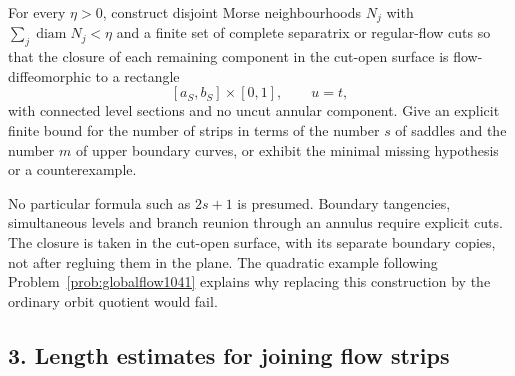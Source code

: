 \begin{problem}\label{prob:reeb1041}
For every $\eta>0$, construct disjoint Morse neighbourhoods $N_j$ with
$\sum_j\operatorname{diam}N_j<\eta$ and a finite set of complete separatrix or
regular-flow cuts so that the closure of each remaining component in
the cut-open surface is flow-diffeomorphic to a rectangle
\[
 [a_S,b_S]\times[0,1],\qquad u=t,
\]
with connected level sections and no uncut annular component.  Give an explicit
finite bound for the number of strips in terms of the number $s$ of
saddles and the number $m$ of upper boundary curves, or exhibit the minimal missing
hypothesis or a counterexample.
\end{problem}

No particular formula such as $2s+1$ is presumed. Boundary tangencies,
simultaneous levels and branch reunion through an annulus require explicit
cuts. The closure is taken in the cut-open surface, with its separate
boundary copies, not after regluing them in the plane. The quadratic
example following Problem~\ref{prob:globalflow1041} explains why replacing
this construction by the ordinary orbit quotient would fail.

\subsection*{3. Length estimates for joining flow strips}

